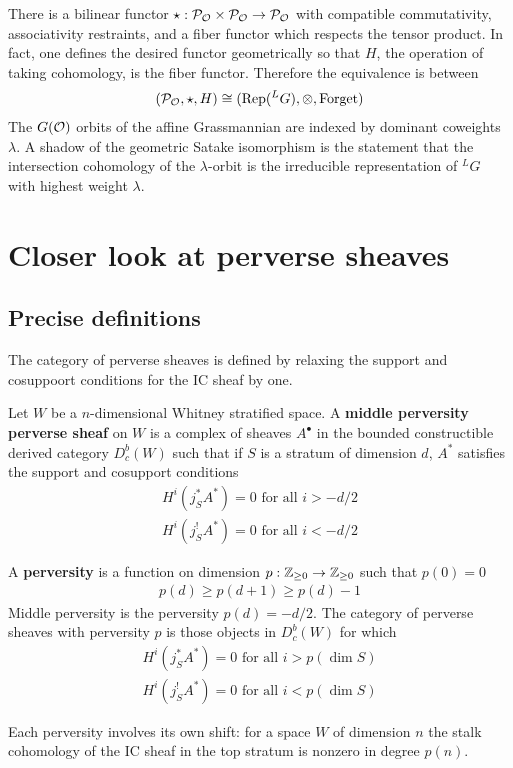\documentclass[12pt]{article}
\begin{document}
There is a bilinear functor $\star:{\mathcal{P}}_{{\mathcal{O}}}\times {\mathcal{P}}_{{\mathcal{O}}} \to {\mathcal{P}}_{{\mathcal{O}}}$ with compatible
commutativity, associativity restraints, and a fiber functor which respects the tensor product.
In fact, one defines the desired functor geometrically so that $H$, the operation
of taking cohomology, is the fiber functor. Therefore
the equivalence is between \begin{align*}
    ({\mathcal{P}}_{{\mathcal{O}}},\star,H) \cong (\operatorname{Rep}(^L G), \otimes, \text{Forget})
\end{align*}
The $G({\mathcal{O}})$ orbits of the affine Grassmannian are indexed by dominant coweights $\lambda$.
A shadow of the geometric Satake isomorphism is the statement that the
intersection cohomology of the $\lambda$-orbit is the irreducible representation of $^L G$
with highest weight $\lambda$.

\section{Closer look at perverse sheaves}

\subsection{Precise definitions}
The category of perverse sheaves is defined by relaxing
the support and cosuppoort conditions for the IC sheaf by one.

\begin{definition}
    Let $W$ be a $n$-dimensional Whitney stratified space. A \textbf{middle perversity
        perverse sheaf} on $W$ is a complex of sheaves $A^\bullet$ in the bounded
    constructible derived category $D^b_c(W)$ such that if $S$ is a stratum of
    dimension $d$, $A^*$ satisfies the support and cosupport conditions
    \begin{align*}
        H^i(j^*_SA^*) = 0 \text{ for all } i > -d/2 \\
        H^i(j^!_SA^*) = 0 \text{ for all } i < -d/2
    \end{align*}
\end{definition}

\begin{definition}
    A \textbf{perversity} is a function on dimension $p:\mathbb{Z}_{\geq 0}\to \mathbb{Z}_{\geq 0}$
    such that $p(0) = 0$ \begin{align*}
        p(d) \geq p(d+1) \geq p(d) - 1
    \end{align*} Middle perversity is the perversity $p(d) = -d/2$. The
    category of perverse sheaves with perversity $p$ is those objects in $D^b_c(W)$
    for which \begin{align*}
        H^i(j^*_SA^*) = 0 \text{ for all } i > p(\dim S) \\
        H^i(j^!_SA^*) = 0 \text{ for all } i < p(\dim S)
    \end{align*}
\end{definition}
Each perversity involves its own shift: for a space $W$ of dimension $n$ the stalk
cohomology of the IC sheaf in the top stratum is nonzero in degree $p(n)$.
\end{document}
